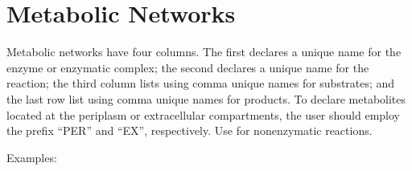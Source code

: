 \documentclass[letterpaper,10pt,english]{sphinxmanual}
\begin{document}
\section{Metabolic Networks}
\label{\detokenize{NetMetabolic:metabolic-networks}}\label{\detokenize{NetMetabolic:net-metabolic}}\label{\detokenize{NetMetabolic::doc}}
Metabolic networks have four columns. The first declares a unique name for the
enzyme or enzymatic complex; the second declares a unique name for the reaction;
the third column lists using comma unique names for substrates; and the last row
list using comma unique names for products. To declare metabolites located at
the periplasm or extracellular compartments, the user should employ the prefix
“PER\sphinxhyphen{}” and “EX\sphinxhyphen{}”, respectively. Use  for non\sphinxhyphen{}enzymatic reactions.

Examples:
\end{document}
